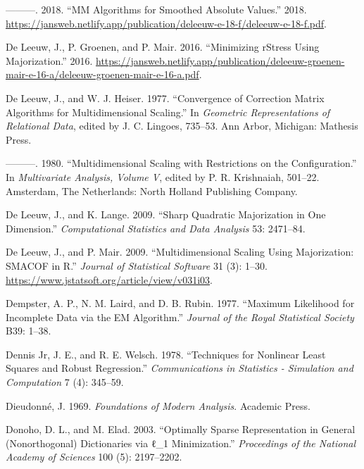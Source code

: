\documentclass[
  12pt,
  letterpaper,
  DIV=11,
  numbers=noendperiod]{scrartcl}
\newlength{\cslhangindent}
\newenvironment{CSLReferences}[2] %
 {\begin{list}{}{%
  \setlength{\itemindent}{0pt}
  \setlength{\leftmargin}{0pt}
  \setlength{\parsep}{0pt}
  \ifodd #1
   \setlength{\leftmargin}{\cslhangindent}
   \setlength{\itemindent}{-1\cslhangindent}
  \fi
  \setlength{\itemsep}{#2\baselineskip}}}
 {\end{list}}
\theoremstyle{definition}
\theoremstyle{plain}
\theoremstyle{plain}
\theoremstyle{remark}
\begin{document}
\begin{CSLReferences}{1}{0}
---------. 2018. {``{MM Algorithms for Smoothed Absolute Values}.''}
2018.
\url{https://jansweb.netlify.app/publication/deleeuw-e-18-f/deleeuw-e-18-f.pdf}.

De Leeuw, J., P. Groenen, and P. Mair. 2016. {``{Minimizing rStress
Using Majorization}.''} 2016.
\url{https://jansweb.netlify.app/publication/deleeuw-groenen-mair-e-16-a/deleeuw-groenen-mair-e-16-a.pdf}.

De Leeuw, J., and W. J. Heiser. 1977. {``Convergence of Correction
Matrix Algorithms for Multidimensional Scaling.''} In \emph{Geometric
Representations of Relational Data}, edited by J. C. Lingoes, 735--53.
Ann Arbor, Michigan: Mathesis Press.

---------. 1980. {``Multidimensional Scaling with Restrictions on the
Configuration.''} In \emph{Multivariate Analysis, Volume {V}}, edited by
P. R. Krishnaiah, 501--22. Amsterdam, The Netherlands: North Holland
Publishing Company.

De Leeuw, J., and K. Lange. 2009. {``Sharp Quadratic Majorization in One
Dimension.''} \emph{Computational Statistics and Data Analysis} 53:
2471--84.

De Leeuw, J., and P. Mair. 2009. {``{Multidimensional Scaling Using
Majorization: SMACOF in R}.''} \emph{Journal of Statistical Software} 31
(3): 1--30. \url{https://www.jstatsoft.org/article/view/v031i03}.

Dempster, A. P., N. M. Laird, and D. B. Rubin. 1977. {``{Maximum
Likelihood for Incomplete Data via the EM Algorithm}.''} \emph{Journal
of the Royal Statistical Society} B39: 1--38.

Dennis Jr, J. E., and R. E. Welsch. 1978. {``Techniques for Nonlinear
Least Squares and Robust Regression.''} \emph{Communications in
Statistics - Simulation and Computation} 7 (4): 345--59.

Dieudonné, J. 1969. \emph{Foundations of Modern Analysis}. Academic
Press.

Donoho, D. L., and M. Elad. 2003. {``Optimally Sparse Representation in
General (Nonorthogonal) Dictionaries via ℓ\_1 Minimization.''}
\emph{Proceedings of the National Academy of Sciences} 100 (5):
2197--2202.


\end{CSLReferences}
\end{document}
